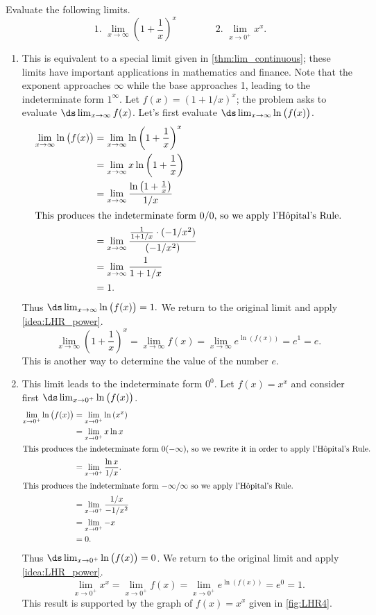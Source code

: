 {Evaluate the following limits.
\[
 \text{1. }\lim_{x\to\infty} \left(1+\frac1x\right)^x \qquad\qquad
 \text{2. }\lim_{x\to0^+} x^x.
\]\clearpage}
{\begin{enumerate}
\item		This is equivalent to a special limit given in \autoref{thm:lim_continuous}; these limits have important applications in mathematics and finance. Note that the exponent approaches $\infty$ while the base approaches 1, leading to the indeterminate form $1^\infty$. Let $f(x) = (1+1/x)^x$; the problem asks to evaluate $\ds\lim_{x\to\infty}f(x)$. Let's first evaluate $\ds \lim_{x\to\infty}\ln\big(f(x)\big)$.
\begin{align*}
\lim_{x\to\infty}\ln\big(f(x)\big)
			&= \lim_{x\to\infty} \ln \left(1+\frac1x\right)^x \\
			&= \lim_{x\to\infty} x\ln\left(1+\frac1x\right)\\
			&= \lim_{x\to\infty} \frac{\ln\left(1+\frac1x\right)}{1/x}\\
			\intertext{This produces the indeterminate form 0/0, so we apply l'H\^opital's Rule.}
			&=	\lim_{x\to\infty} \frac{\frac{1}{1+1/x}\cdot(-1/x^2)}{(-1/x^2)} \\
			&= \lim_{x\to\infty}\frac{1}{1+1/x}\\
			&= 1.
\end{align*}
Thus $\ds\lim_{x\to\infty} \ln \big(f(x)\big) = 1.$ We return to the original limit and apply \autoref{idea:LHR_power}.
$$\lim_{x\to\infty}\left(1+\frac1x\right)^x = \lim_{x\to\infty} f(x) =  \lim_{x\to\infty}e^{\ln (f(x))} = e^1 = e.$$
This is another way to determine the value of the number $e$.

\item		This limit leads to the indeterminate form $0^0$. Let $f(x) = x^x$ and consider first $\ds\lim_{x\to0^+} \ln\big(f(x)\big)$. 
\begin{align*}
\lim_{x\to0^+} \ln\big(f(x)\big) &= \lim_{x\to0^+} \ln\left(x^x\right) \\
			&= \lim_{x\to0^+} x\ln x \\
			\intertext{This produces the indeterminate form $0(-\infty)$, so we rewrite it in order to apply l'H\^opital's Rule.}
			&= \lim_{x\to0^+} \frac{\ln x}{1/x}.\\
			\intertext{This produces the indeterminate form $-\infty/\infty$ so we apply l'H\^opital's Rule.}
			&=	\lim_{x\to0^+} \frac{1/x}{-1/x^2} \\
			&= \lim_{x\to0^+} -x \\
			&= 0.
\end{align*}
Thus $\ds\lim_{x\to0^+} \ln\big(f(x)\big) =0$. We return to the original limit and apply \autoref{idea:LHR_power}.
$$\lim_{x\to0^+} x^x = \lim_{x\to0^+} f(x) = \lim_{x\to0^+} e^{\ln(f(x))} = e^0 = 1.$$
This result is supported by the graph of $f(x)=x^x$ given in \autoref{fig:LHR4}.\eoehere
\end{enumerate}}

